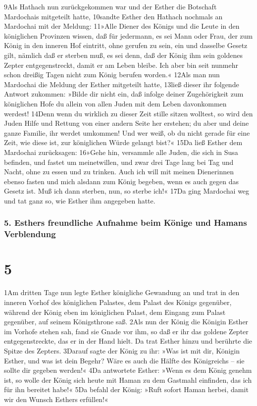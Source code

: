9Als Hathach nun zurückgekommen war und der Esther die Botschaft
Mardochais mitgeteilt hatte, 10sandte Esther den Hathach nochmals an
Mardochai mit der Meldung: 11»Alle Diener des Königs und die Leute in
den königlichen Provinzen wissen, daß für jedermann, es sei Mann oder
Frau, der zum König in den inneren Hof eintritt, ohne gerufen zu sein,
ein und dasselbe Gesetz gilt, nämlich daß er sterben muß, es sei denn,
daß der König ihm sein goldenes Zepter entgegenstreckt, damit er am
Leben bleibe. Ich aber bin seit nunmehr schon dreißig Tagen nicht zum
König berufen worden.« 12Als man nun Mardochai die Meldung der Esther
mitgeteilt hatte, 13ließ dieser ihr folgende Antwort zukommen: »Bilde
dir nicht ein, daß infolge deiner Zugehörigkeit zum königlichen Hofe du
allein von allen Juden mit dem Leben davonkommen werdest! 14Denn wenn du
wirklich zu dieser Zeit stille sitzen wolltest, so wird den Juden Hilfe
und Rettung von einer andern Seite her erstehen; du aber und deine ganze
Familie, ihr werdet umkommen! Und wer weiß, ob du nicht gerade für eine
Zeit, wie diese ist, zur königlichen Würde gelangt bist?« 15Da ließ
Esther dem Mardochai zurücksagen: 16»Gehe hin, versammle alle Juden, die
sich in Susa befinden, und fastet um meinetwillen, und zwar drei Tage
lang bei Tag und Nacht, ohne zu essen und zu trinken. Auch ich will mit
meinen Dienerinnen ebenso fasten und mich alsdann zum König begeben,
wenn es auch gegen das Gesetz ist. Muß ich dann sterben, nun, so sterbe
ich!« 17Da ging Mardochai weg und tat ganz so, wie Esther ihm angegeben
hatte.

\hypertarget{esthers-freundliche-aufnahme-beim-kuxf6nige-und-hamans-verblendung}{%
\subsubsection{5. Esthers freundliche Aufnahme beim Könige und Hamans
Verblendung}\label{esthers-freundliche-aufnahme-beim-kuxf6nige-und-hamans-verblendung}}

\hypertarget{section-4}{%
\section{5}\label{section-4}}

1Am dritten Tage nun legte Esther königliche Gewandung an und trat in
den inneren Vorhof des königlichen Palastes, dem Palast des Königs
gegenüber, während der König eben im königlichen Palast, dem Eingang zum
Palast gegenüber, auf seinem Königsthrone saß. 2Als nun der König die
Königin Esther im Vorhofe stehen sah, fand sie Gnade vor ihm, so daß er
ihr das goldene Zepter entgegenstreckte, das er in der Hand hielt. Da
trat Esther hinzu und berührte die Spitze des Zepters. 3Darauf sagte der
König zu ihr: »Was ist mit dir, Königin Esther, und was ist dein Begehr?
Wäre es auch die Hälfte des Königreichs -- sie sollte dir gegeben
werden!« 4Da antwortete Esther: »Wenn es dem König genehm ist, so wolle
der König sich heute mit Haman zu dem Gastmahl einfinden, das ich für
ihn bereitet habe!« 5Da befahl der König: »Ruft sofort Haman herbei,
damit wir den Wunsch Esthers erfüllen!«


